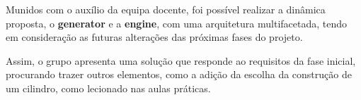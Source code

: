 \documentclass[runningheads]{llncs}
\begin{document}
Munidos com o auxílio da equipa docente, foi possível realizar a dinâmica proposta, o \textbf{generator} e a \textbf{engine}, com uma arquitetura multifacetada, tendo em consideração as futuras alterações das próximas fases do projeto.

Assim, o grupo apresenta uma solução que responde ao requisitos da fase inicial, procurando trazer outros elementos, como a adição da escolha da construção de um cilindro, como lecionado nas aulas práticas.

%
%
%
% 
% 
%
\end{document}
